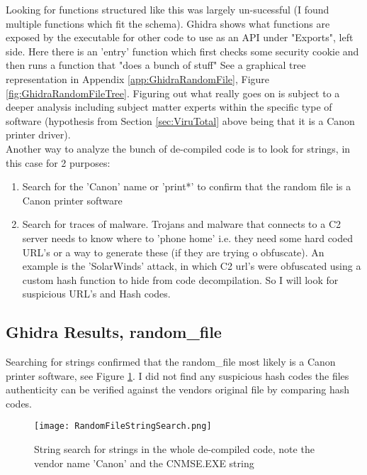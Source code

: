 \documentclass[
	letterpaper, %
	10pt, %
	unnumberedsections, %
	twoside, %
]{APAAssignment}
\begin{document}
Looking for functions structured like this was largely un-sucessful (I found multiple functions which fit the schema). Ghidra shows what functions are exposed by the executable for other code to use as an API under "Exports", left side. Here there is an 'entry' function which first checks some security cookie and then runs a function that "does a bunch of stuff" See a graphical tree representation in Appendix \ref{app:GhidraRandomFile}, Figure \ref{fig:GhidraRandomFileTree}. Figuring out what really goes on is subject to a deeper analysis including subject matter experts within the specific type of software (hypothesis from Section \ref{sec:ViruTotal} above being that it is a Canon printer driver). \\
Another way to analyze the bunch of de-compiled code is to look for strings, in this case for 2 purposes:
\begin{enumerate}
	\item Search for the 'Canon' name or 'print*' to confirm that the random file is a Canon printer software
	\item Search for traces of malware. Trojans and malware that connects to a C2 server needs to know where to 'phone home' i.e. they need some hard coded URL's or a way to generate these (if they are trying o obfuscate). An example is the 'SolarWinds' attack, in which C2 url's were obfuscated using a custom hash function to hide from code decompilation\cite{MandiantSW}. So I will look for suspicious URL's and Hash codes. 
\end{enumerate}

\subsection{Ghidra Results, random\_file}
Searching for strings confirmed that the random\_file most likely is a Canon printer software, see Figure \ref{fig:GhidraRandomFileString}. I did not find any suspicious hash codes the files authenticity can be verified against the vendors original file by comparing hash codes.

\begin{figure}[!htp] %
	\centering
	\texttt{[image: RandomFileStringSearch.png]}
	\caption{String search for strings in the whole de-compiled code, note the vendor name 'Canon' and the CNMSE.EXE string}
	\label{fig:GhidraRandomFileString}
\end{figure}
\end{document}
